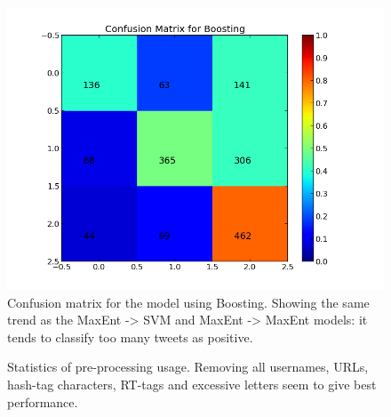 \begin{minipage}[t!]{\linewidth}
     \centering
     \begin{minipage}{0.45\linewidth}
	     \begin{figure}[H]
	          \includegraphics[width=\linewidth]{../img/plots/grid/confusion_matrix_Boosting.png}
	      \caption[The confusion matrix for Boosting]{Confusion matrix for the model using Boosting. Showing the same trend as the MaxEnt -> SVM and MaxEnt -> MaxEnt models: it tends to classify too many tweets as positive.}
	      \label{fig:confmat_boosting}
	     \end{figure}
     \end{minipage}
\end{minipage}

\begin{figure}[b!]
	\centering
	\caption[Statistics of pre-processing usage.]{Statistics of pre-processing usage. Removing all usernames, URLs, hash-tag characters, RT-tags and excessive letters seem to give best performance.}
	\label{fig:preprocess_usage}
\end{figure}


